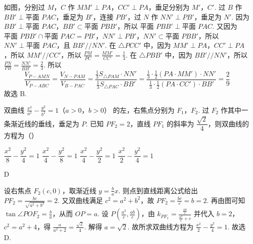 \begin{solution}
如图，分别过 \(M\)，\(C\) 作 \(MM'\perp PA\)，\(CC'\perp PA\)，垂足分别为 \(M'\)，\(C'\). 过 \(B\) 作 \(BB'\perp \text{平面 }PAC\)，垂足为 \(B'\)，连接 \(PB'\)，过 \(N\) 作 \(NN'\perp PB'\)，垂足为 \(N'\).
因为 \(BB'\perp \text{平面 }PAC\)，\(BB'\subset \text{平面 }PBB'\)，所以 \(\text{平面 }PBB'\perp \text{平面 }PAC\). 又因为 \(\text{平面 }PBB'\cap \text{平面 }PAC=PB'\)，\(NN'\perp PB'\)，\(NN'\subset \text{平面 }PBB'\)，所以 \(NN'\perp \text{平面 }PAC\)，且 \(BB'//NN'\). 在 \(\triangle PCC'\) 中，因为 \(MM'\perp PA\)，\(CC'\perp PA\)，所以 \(MM'//CC'\)，所以 \(\frac{PM}{PC}=\frac{MM'}{CC'}=\frac{1}{3}\). 在 \(\triangle PBB'\) 中，因为 \(BB'//NN'\)，所以 \(\frac{PN}{PB}=\frac{NN'}{BB'}=\frac{2}{3}\). 所以
\[
\frac{V_{P-AMN}}{V_{P-ABC}}
=\frac{V_{N-PAM}}{V_{B-PAC}}
=\frac{\frac{1}{3}S_{\triangle PAM}\cdot NN'}{\frac{1}{3}S_{\triangle PAC}\cdot BB'}
=\frac{\frac{1}{3}\cdot \frac{1}{2}\left( PA\cdot MM' \right)\cdot NN'}{\frac{1}{3}\cdot \frac{1}{2}\left( PA\cdot CC' \right)\cdot BB'}
=\frac{2}{9}
\]
故选 B.
\end{solution}

\begin{problem}
双曲线 \(\frac{x^2}{a^2}-\frac{y^2}{b^2}=1\)（\(a>0\)，\(b>0\)） 的左，右焦点分别为 \(F_1\)，\(F_2\). 过 \(F_2\) 作其中一条渐近线的垂线，垂足为 \(P\). 已知 \(PF_2=2\)，直线 \(PF_1\) 的斜率为 \(\dfrac{\sqrt{2}}{4}\)，则双曲线的方程为（\quad）


\choices
    {\(\dfrac{x^2}{8}-\dfrac{y^2}{4}=1\)}
    {\(\dfrac{x^2}{4}-\dfrac{y^2}{8}=1\)}
    {\(\dfrac{x^2}{4}-\dfrac{y^2}{2}=1\)}
    {\(\dfrac{x^2}{2}-\dfrac{y^2}{4}=1\)}
\end{problem}

\begin{answer}
D
\end{answer}

\begin{solution}
设右焦点 \(F_2(c,0)\)，取渐近线 \(y=\frac{b}{a}x\). 则点到直线距离公式给出 \(PF_2=\frac{bc}{\sqrt{a^2+b^2}}=2\). 又双曲线满足 \(c^2=a^2+b^2\)，故 \(PF_2=\frac{bc}{c}=b=2\). 再由图可知 \(\tan \angle POF_2=\frac{b}{a}\)，从而 \(OP=a\). 设 \(P\left( \frac{a^2}{c},\frac{ab}{c} \right)\)，由 \(k_{PF_1}=\frac{\frac{ab}{c}}{\frac{a^2}{c}+c}\) 并代入 \(b=2\)，\(c^2=a^2+4\)，得 \(\frac{a}{a^2+2}=\frac{\sqrt2}{4}\). 解得 \(a=\sqrt2\). 故所求双曲线方程为 \(\frac{x^2}{2}-\frac{y^2}{4}=1\). 故选 D.
\end{solution}
